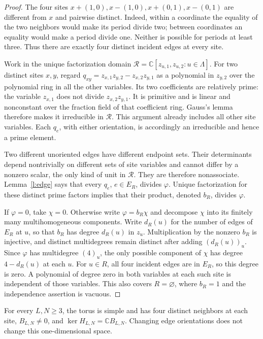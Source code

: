 \begin{proof}
The four sites \(x+(1,0),x-(1,0),x+(0,1),x-(0,1)\) are
different from \(x\) and pairwise distinct. Indeed, within a
coordinate the equality of the two neighbors would make its period
divide two; between coordinates an equality would make a period
divide one. Neither is possible for periods at least three.
Thus there are exactly four distinct incident edges at every site.

Work in the unique factorization domain
\(\mathcal R=\mathbb C[z_{u,1},z_{u,2}:u\in\Lambda]\).
For two distinct sites \(x,y\), regard
\(q_{xy}=z_{x,1}z_{y,2}-z_{x,2}z_{y,1}\) as a polynomial in
\(z_{y,2}\) over the polynomial ring in all the other variables.
Its two coefficients are relatively prime: the variable
\(z_{x,1}\) does not divide \(z_{x,2}z_{y,1}\).
It is primitive and is linear and nonconstant over the fraction
field of that coefficient ring. Gauss's lemma therefore makes it
irreducible in \(\mathcal R\). This argument already includes all
other site variables. Each \(q_e\), with either orientation, is
accordingly an irreducible and hence a prime element.

Two different unoriented edges have different endpoint sets.
Their determinants depend nontrivially on different sets of site
variables and cannot differ by a nonzero scalar, the only kind of
unit in \(\mathcal R\). They are therefore nonassociate.
Lemma~\ref{l:edge} says that every \(q_e\), \(e\in E_R\),
divides \(\varphi\). Unique factorization for these distinct prime
factors implies that their product, denoted \(b_R\), divides
\(\varphi\).

If \(\varphi=0\), take \(\chi=0\). Otherwise write
\(\varphi=b_R\chi\) and decompose \(\chi\) into its finitely
many multihomogeneous components. Write \(d_R(u)\) for the number
of edges of \(E_R\) at \(u\), so that \(b_R\) has degree
\(d_R(u)\) in \(z_u\). Multiplication by the nonzero \(b_R\)
is injective, and distinct multidegrees remain distinct after adding
\((d_R(u))_u\). Since \(\varphi\) has multidegree \((4)_u\),
the only possible component of \(\chi\) has degree
\(4-d_R(u)\) at each \(u\). For \(u\in R\), all four incident
edges are in \(E_R\), so this degree is zero. A polynomial of
degree zero in both variables at each such site is independent of
those variables. This also covers \(R=\varnothing\), where
\(b_R=1\) and the independence assertion is vacuous.
\end{proof}

\begin{proposition}\label{p:toruskernel}
For every \(L,N\ge3\), the torus is simple and has four distinct
neighbors at each site, \(B_{L,N}\ne0\), and
\(\ker H_{L,N}=\mathbb C B_{L,N}\).
Changing edge orientations does not change this one-dimensional space.
\end{proposition}

